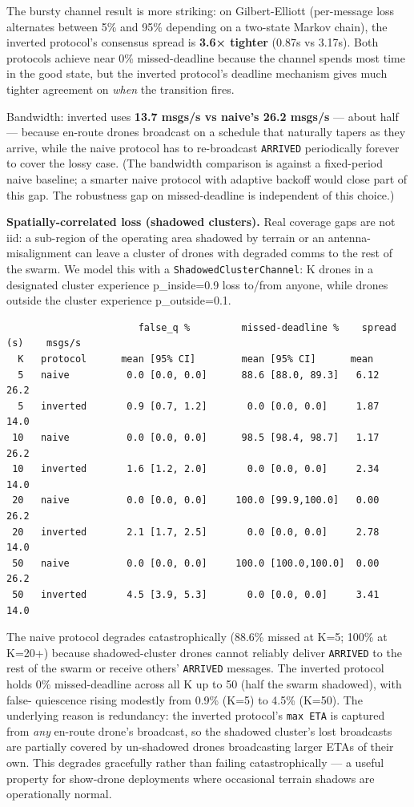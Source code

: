 The bursty channel result is more striking: on Gilbert-Elliott
(per-message loss alternates between 5\% and 95\% depending on a
two-state Markov chain), the inverted protocol's consensus spread is
\textbf{3.6× tighter} (0.87s vs 3.17s). Both protocols achieve near 0\%
missed-deadline because the channel spends most time in the good state,
but the inverted protocol's deadline mechanism gives much tighter
agreement on \emph{when} the transition fires.

Bandwidth: inverted uses \textbf{13.7 msgs/s vs naive's 26.2 msgs/s} ---
about half --- because en-route drones broadcast on a schedule that
naturally tapers as they arrive, while the naive protocol has to
re-broadcast \texttt{ARRIVED} periodically forever to cover the lossy
case. (The bandwidth comparison is against a fixed-period naive
baseline; a smarter naive protocol with adaptive backoff would close
part of this gap. The robustness gap on missed-deadline is independent
of this choice.)

\textbf{Spatially-correlated loss (shadowed clusters).} Real coverage
gaps are not iid: a sub-region of the operating area shadowed by terrain
or an antenna-misalignment can leave a cluster of drones with degraded
comms to the rest of the swarm. We model this with a
\texttt{ShadowedClusterChannel}: K drones in a designated cluster
experience p\_inside=0.9 loss to/from anyone, while drones outside the
cluster experience p\_outside=0.1.

\begin{verbatim}
                       false_q %         missed-deadline %    spread (s)    msgs/s
  K   protocol      mean [95% CI]        mean [95% CI]      mean
  5   naive          0.0 [0.0, 0.0]      88.6 [88.0, 89.3]   6.12            26.2
  5   inverted       0.9 [0.7, 1.2]       0.0 [0.0, 0.0]     1.87            14.0
 10   naive          0.0 [0.0, 0.0]      98.5 [98.4, 98.7]   1.17            26.2
 10   inverted       1.6 [1.2, 2.0]       0.0 [0.0, 0.0]     2.34            14.0
 20   naive          0.0 [0.0, 0.0]     100.0 [99.9,100.0]   0.00            26.2
 20   inverted       2.1 [1.7, 2.5]       0.0 [0.0, 0.0]     2.78            14.0
 50   naive          0.0 [0.0, 0.0]     100.0 [100.0,100.0]  0.00            26.2
 50   inverted       4.5 [3.9, 5.3]       0.0 [0.0, 0.0]     3.41            14.0
\end{verbatim}

The naive protocol degrades catastrophically (88.6\% missed at K=5;
100\% at K=20+) because shadowed-cluster drones cannot reliably deliver
\texttt{ARRIVED} to the rest of the swarm or receive others'
\texttt{ARRIVED} messages. The inverted protocol holds 0\%
missed-deadline across all K up to 50 (half the swarm shadowed), with
false- quiescence rising modestly from 0.9\% (K=5) to 4.5\% (K=50). The
underlying reason is redundancy: the inverted protocol's
\texttt{max\ ETA} is captured from \emph{any} en-route drone's
broadcast, so the shadowed cluster's lost broadcasts are partially
covered by un-shadowed drones broadcasting larger ETAs of their own.
This degrades gracefully rather than failing catastrophically --- a
useful property for show-drone deployments where occasional terrain
shadows are operationally normal.

